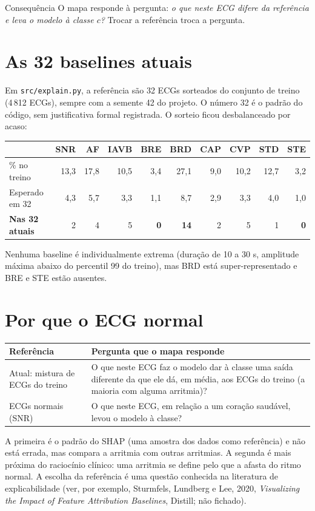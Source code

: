 \documentclass[11pt,a4paper]{article}
\begin{document}
\begin{infobox}[note]{Consequência}
O mapa responde à pergunta: \textit{o que neste ECG difere da referência e leva o modelo à classe $c$?} Trocar a referência troca a pergunta.
\end{infobox}

\section{As 32 baselines atuais}
Em \texttt{src/explain.py}, a referência são 32 ECGs sorteados do conjunto de treino (4\,812 ECGs), sempre com a semente 42 do projeto. O número 32 é o padrão do código, sem justificativa formal registrada. O sorteio ficou desbalanceado por acaso:
\begin{center}\small
\begin{tabular}{lrrrrrrrrr}
\toprule
& \textbf{SNR} & \textbf{AF} & \textbf{IAVB} & \textbf{BRE} & \textbf{BRD} & \textbf{CAP} & \textbf{CVP} & \textbf{STD} & \textbf{STE} \\
\midrule
\% no treino & 13,3 & 17,8 & 10,5 & 3,4 & 27,1 & 9,0 & 10,2 & 12,7 & 3,2 \\
Esperado em 32 & 4,3 & 5,7 & 3,3 & 1,1 & 8,7 & 2,9 & 3,3 & 4,0 & 1,0 \\
\textbf{Nas 32 atuais} & 2 & 4 & 5 & \textbf{0} & \textbf{14} & 2 & 5 & 1 & \textbf{0} \\
\bottomrule
\end{tabular}
\end{center}
Nenhuma baseline é individualmente extrema (duração de 10 a 30 s, amplitude máxima abaixo do percentil 99 do treino), mas BRD está super-representado e BRE e STE estão ausentes.

\section{Por que o ECG normal}
\begin{center}\small
\begin{tabularx}{\linewidth}{lX}
\toprule
\textbf{Referência} & \textbf{Pergunta que o mapa responde} \\
\midrule
Atual: mistura de ECGs do treino & O que neste ECG faz o modelo dar à classe uma saída diferente da que ele dá, em média, aos ECGs do treino (a maioria com alguma arritmia)? \\ \addlinespace
ECGs normais (SNR) & O que neste ECG, em relação a um coração saudável, levou o modelo à classe? \\
\bottomrule
\end{tabularx}
\end{center}
A primeira é o padrão do SHAP (uma amostra dos dados como referência) e não está errada, mas compara a arritmia com outras arritmias. A segunda é mais próxima do raciocínio clínico: uma arritmia se define pelo que a afasta do ritmo normal. A escolha da referência é uma questão conhecida na literatura de explicabilidade (ver, por exemplo, Sturmfels, Lundberg e Lee, 2020, \textit{Visualizing the Impact of Feature Attribution Baselines}, Distill; não fichado).
\end{document}
